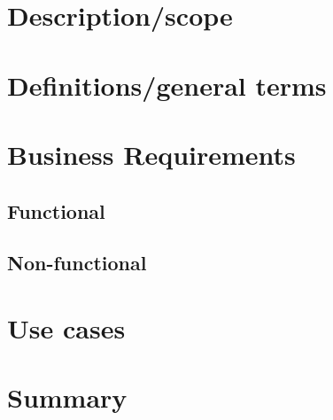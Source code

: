 \section{Description/scope}
\section{Definitions/general terms}
\section{Business Requirements}
\subsection{Functional}
\subsection{Non-functional}
\section{Use cases}
\section{Summary}